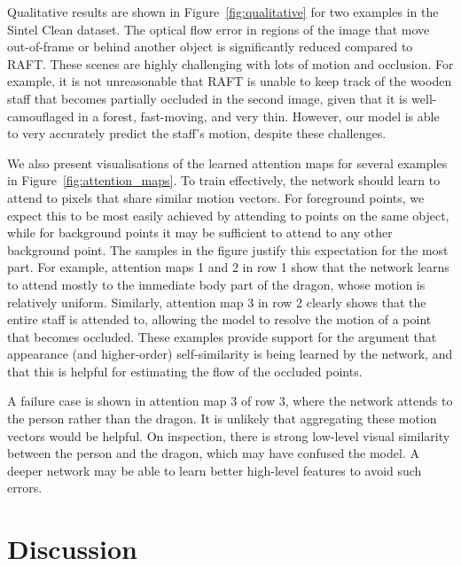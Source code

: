 \documentclass[10pt,twocolumn,letterpaper]{article}
\begin{document}
Qualitative results are shown in Figure~\ref{fig:qualitative} for two examples in the Sintel Clean dataset. The optical flow error in regions of the image that move out-of-frame or behind another object is significantly reduced compared to RAFT. These scenes are highly challenging with lots of motion and occlusion. For example, it is not unreasonable that RAFT is unable to keep track of the wooden staff that becomes partially occluded in the second image, given that it is well-camouflaged in a forest, fast-moving, and very thin. However, our model is able to very accurately predict the staff's motion, despite these challenges.

We also present visualisations of the learned attention maps for several examples in Figure~\ref{fig:attention_maps}. To train effectively, the network should learn to attend to pixels that share similar motion vectors. For foreground points, we expect this to be  most easily achieved by attending to points on the same object, while for background points it may be sufficient to attend to any other background point. The samples in the figure justify this expectation for the most part. For example, attention maps 1 and 2 in row 1 show that the network learns to attend mostly to the immediate body part of the dragon, whose motion is relatively uniform. Similarly, attention map 3 in row 2 clearly shows that the entire staff is attended to, allowing the model to resolve the motion of a point that becomes occluded. These examples provide support for the argument that appearance (and higher-order) self-similarity is being learned by the network, and that this is helpful for estimating the flow of the occluded points.

A failure case is shown in attention map 3 of row 3, where the network attends to the person rather than the dragon. It is unlikely that aggregating these motion vectors would be helpful. On inspection, there is strong low-level visual similarity between the person and the dragon, which may have confused the model. A deeper network may be able to learn better high-level features to avoid such errors.


\section{Discussion}
\label{Sec:discussion}
\end{document}

